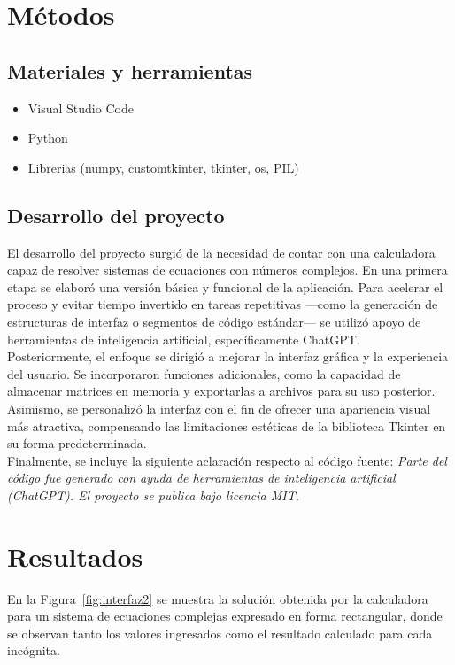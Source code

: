\documentclass[12pt,a4paper]{article}
\begin{document}
\section{Métodos}

\subsection{Materiales y herramientas}
\begin{itemize}
    \item Visual Studio Code
    \item Python
    \item Librerias (numpy, customtkinter, tkinter, os, PIL)
\end{itemize}

\subsection{Desarrollo del proyecto}

El desarrollo del proyecto surgió de la necesidad de contar con una calculadora capaz de resolver sistemas de ecuaciones con números complejos. En una primera etapa se elaboró una versión básica y funcional de la aplicación. Para acelerar el proceso y evitar tiempo invertido en tareas repetitivas —como la generación de estructuras de interfaz o segmentos de código estándar— se utilizó apoyo de herramientas de inteligencia artificial, específicamente ChatGPT. \\

Posteriormente, el enfoque se dirigió a mejorar la interfaz gráfica y la experiencia del usuario. Se incorporaron funciones adicionales, como la capacidad de almacenar matrices en memoria y exportarlas a archivos para su uso posterior. Asimismo, se personalizó la interfaz con el fin de ofrecer una apariencia visual más atractiva, compensando las limitaciones estéticas de la biblioteca Tkinter en su forma predeterminada. \\

Finalmente, se incluye la siguiente aclaración respecto al código fuente:  
\textit{Parte del código fue generado con ayuda de herramientas de inteligencia artificial (ChatGPT). El proyecto se publica bajo licencia MIT.}

\section{Resultados}

En la Figura~\ref{fig:interfaz2} se muestra la solución obtenida por la calculadora para un sistema de ecuaciones complejas expresado en forma rectangular, donde se observan tanto los valores ingresados como el resultado calculado para cada incógnita.
\end{document}
